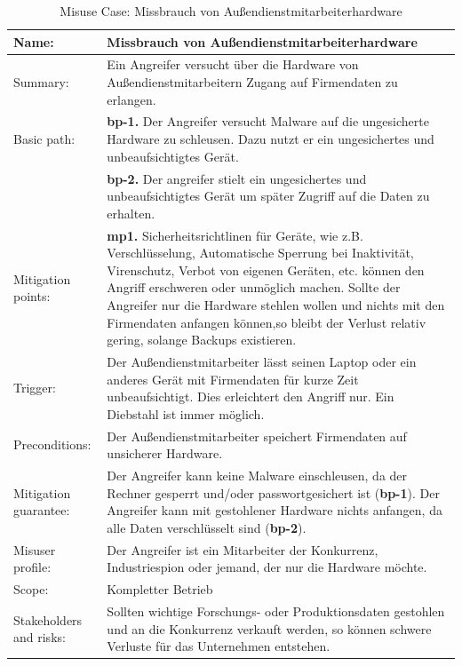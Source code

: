 \begin{table}[h]
\scriptsize
\centering
\caption{Misuse Case: Missbrauch von Außendienstmitarbeiterhardware}
\label{tab:MisuseCaseTemplate}
\begin{tabular}{p{}p{}}
\hline 
Name: & Missbrauch von Außendienstmitarbeiterhardware \\ 
\hline 
Summary: & Ein Angreifer versucht über die Hardware von Außendienstmitarbeitern Zugang auf Firmendaten zu erlangen.\\
\hline
Basic path: & \textbf{bp-1.} Der Angreifer versucht Malware auf die ungesicherte Hardware zu schleusen. Dazu nutzt er ein ungesichertes und unbeaufsichtigtes Gerät.\\
 & \textbf{bp-2.} Der angreifer stielt ein ungesichertes und unbeaufsichtigtes Gerät um später Zugriff auf die Daten zu erhalten.\\ 
\hline 
Mitigation points: & \textbf{mp1.} Sicherheitsrichtlinen für Geräte, wie z.B. Verschlüsselung, Automatische Sperrung bei Inaktivität, Virenschutz, Verbot von eigenen Geräten, etc. können den Angriff erschweren oder unmöglich machen. Sollte der Angreifer nur die Hardware stehlen wollen und nichts mit den Firmendaten anfangen können,so bleibt der Verlust relativ gering, solange Backups existieren.\\ 
\hline 
Trigger: & Der Außendienstmitarbeiter lässt seinen Laptop oder ein anderes Gerät mit Firmendaten für kurze Zeit unbeaufsichtigt. Dies erleichtert den Angriff nur. Ein Diebstahl ist immer möglich.\\ 
\hline 
Preconditions: & Der Außendienstmitarbeiter speichert Firmendaten auf unsicherer Hardware.\\ 
\hline 
Mitigation guarantee: & Der Angreifer kann keine Malware einschleusen, da der Rechner gesperrt und/oder passwortgesichert ist (\textbf{bp-1}). Der Angreifer kann mit gestohlener Hardware nichts anfangen, da alle Daten verschlüsselt sind (\textbf{bp-2}).\\ 
\hline 
Misuser profile: & Der Angreifer ist ein Mitarbeiter der Konkurrenz, Industriespion oder jemand, der nur die Hardware möchte. \\ 
\hline 
Scope: & Kompletter Betrieb \\ 
\hline 
Stakeholders and risks: & Sollten wichtige Forschungs- oder Produktionsdaten gestohlen und an die Konkurrenz verkauft werden, so können schwere Verluste für das Unternehmen entstehen. \\ 
\hline 
\end{tabular} 
\end{table}

